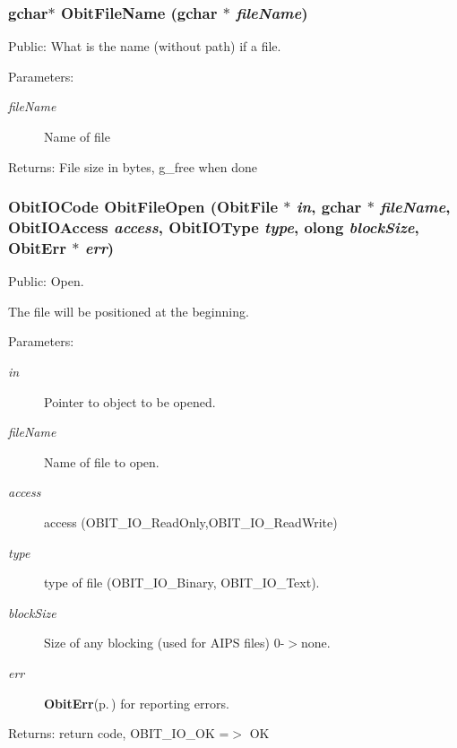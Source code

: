 \subsubsection{\setlength{\rightskip}{0pt plus 5cm}gchar$\ast$ Obit\-File\-Name (gchar $\ast$ {\em file\-Name})}\label{ObitFile_8c_a14}


Public: What is the name (without path) if a file. 

\begin{Desc}
\item[Parameters:]
\begin{description}
\item[{\em file\-Name}]Name of file \end{description}
\end{Desc}
\begin{Desc}
\item[Returns:]File size in bytes, g\_\-free when done \end{Desc}
\subsubsection{\setlength{\rightskip}{0pt plus 5cm}Obit\-IOCode Obit\-File\-Open ({\bf Obit\-File} $\ast$ {\em in}, gchar $\ast$ {\em file\-Name}, Obit\-IOAccess {\em access}, Obit\-IOType {\em type}, {\bf olong} {\em block\-Size}, {\bf Obit\-Err} $\ast$ {\em err})}\label{ObitFile_8c_a15}


Public: Open. 

The file will be positioned at the beginning. \begin{Desc}
\item[Parameters:]
\begin{description}
\item[{\em in}]Pointer to object to be opened. \item[{\em file\-Name}]Name of file to open. \item[{\em access}]access (OBIT\_\-IO\_\-Read\-Only,OBIT\_\-IO\_\-Read\-Write) \item[{\em type}]type of file (OBIT\_\-IO\_\-Binary, OBIT\_\-IO\_\-Text). \item[{\em block\-Size}]Size of any blocking (used for AIPS files) 0-$>$none. \item[{\em err}]{\bf Obit\-Err}{\rm (p.\,\pageref{structObitErr})} for reporting errors. \end{description}
\end{Desc}
\begin{Desc}
\item[Returns:]return code, OBIT\_\-IO\_\-OK =$>$ OK \end{Desc}
